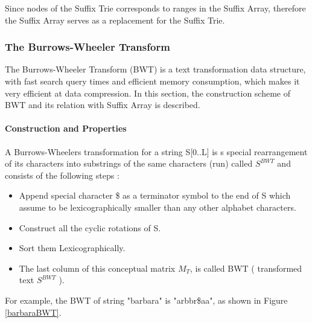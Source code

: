 \documentclass[11pt,a4paper]{report}
\begin{document}
Since nodes of the Suffix Trie corresponds to ranges in the Suffix 
Array, therefore the Suffix Array serves as a replacement for 
the Suffix Trie.



\subsubsection{The Burrows-Wheeler Transform} 
\label{The Burrows-Wheeler Transform}


The Burrows-Wheeler Transform (BWT) is a text transformation data structure, 
with fast search query times and efficient memory consumption, which makes 
it very efficient at data compression. In this section, the construction scheme
of BWT and its relation with Suffix Array is described.\\



\paragraph{Construction and Properties}

A Burrows-Wheelers transformation for a string S[0..L] is s special rearrangement 
of its characters into substrings of the same characters (run) called $S^{BWT}$ 
and consists of the following steps \cite{bwt}:

\begin{itemize} 
	\item Append special character \$ as a terminator symbol to the end of S 
	which assume to be lexicographically smaller than any other alphabet 
	characters.
	\item  Construct all the cyclic rotations of S.
	\item  Sort them Lexicographically.
	\item The last column of this conceptual matrix \emph{$M_{T}$}, is called 
	BWT ( transformed text $S^{BWT}$ ).
\end{itemize}


For example, the BWT of string "barbara" is "arbbr\$aa", as shown in Figure 
\ref{barbaraBWT}.\\
\end{document}
